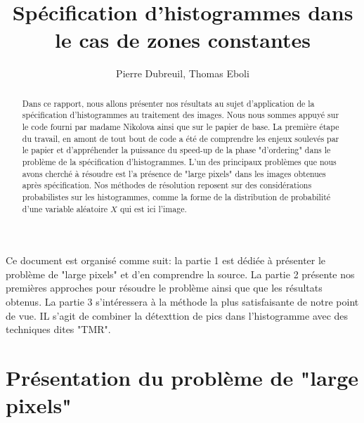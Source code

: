 \documentclass{article}
\title{Spécification d'histogrammes dans le cas de zones constantes}
\author{Pierre Dubreuil, Thomas Eboli}
\begin{document}
\maketitle

\begin{abstract}
Dans ce rapport, nous allons présenter nos résultats au sujet d'application de la spécification d'histogrammes au traitement des images. Nous nous sommes appuyé sur le code fourni par madame Nikolova ainsi que sur le papier de base. La première étape du travail, en amont de tout bout de code a été de comprendre les enjeux soulevés par le papier et d'appréhender la puissance du speed-up de la phase "d'ordering" dans le problème de la spécification d'histogrammes. L'un des principaux problèmes que nous avons cherché à résoudre est l'a présence de "large pixels" dans les images obtenues après spécification. Nos méthodes de résolution reposent sur des considérations probabilistes sur les histogrammes, comme la forme de la distribution de probabilité d'une variable aléatoire $X$ qui est ici l'image.
\end{abstract}

\paragraph*{}
Ce document est organisé comme suit: la partie 1 est dédiée à présenter le problème de "large pixels" et d'en comprendre la source. La partie 2 présente nos premières approches pour résoudre le problème ainsi que que les résultats obtenus. La partie 3 s'intéressera à la méthode la plus satisfaisante de notre point de vue. IL s'agit de combiner la détexttion de pics dans l'histogramme avec des techniques dites "TMR".

\section{Présentation du problème de "large pixels"}
\end{document}
